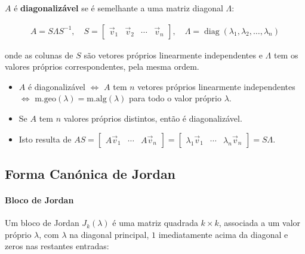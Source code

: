 \documentclass{article}
\begin{document}
$A$ é \textbf{diagonalizável} se é semelhante a uma matriz diagonal $\Lambda$:

\begin{gather*}
\boxed{A = S \Lambda S^{-1}},
\quad
S =
\begin{bmatrix}
\vec{v}_1 & \vec{v}_2 & \cdots & \vec{v}_n
\end{bmatrix},
\quad
\Lambda = \operatorname{diag}(\lambda_1, \lambda_2, \ldots, \lambda_n)
\end{gather*}

onde as colunas de $S$ são vetores próprios linearmente independentes e $\Lambda$ tem os valores próprios
correspondentes, pela mesma ordem.

\begin{itemize}
    \item $A$ é diagonalizável $\iff$ $A$ tem $n$ vetores próprios linearmente independentes $\iff$
    $\text{m.geo}(\lambda) = \text{m.alg}(\lambda)$ para todo o valor próprio $\lambda$.
    \item Se $A$ tem $n$ valores próprios distintos, então é diagonalizável.
    \item Isto resulta de
    $AS = \begin{bmatrix} A\vec{v}_1 & \cdots & A\vec{v}_n \end{bmatrix}
    = \begin{bmatrix} \lambda_1 \vec{v}_1 & \cdots & \lambda_n \vec{v}_n \end{bmatrix} = S\Lambda$.
\end{itemize}

\bigskip

\subsection{Forma Canónica de Jordan}
\label{subsec: forma-canonica-jordan}

\paragraph{Bloco de Jordan}

Um bloco de Jordan $J_k(\lambda)$ é uma matriz quadrada $k \times k$, associada a um valor próprio $\lambda$,
com $\lambda$ na diagonal principal, $1$ imediatamente acima da diagonal e zeros nas restantes entradas:
\end{document}
